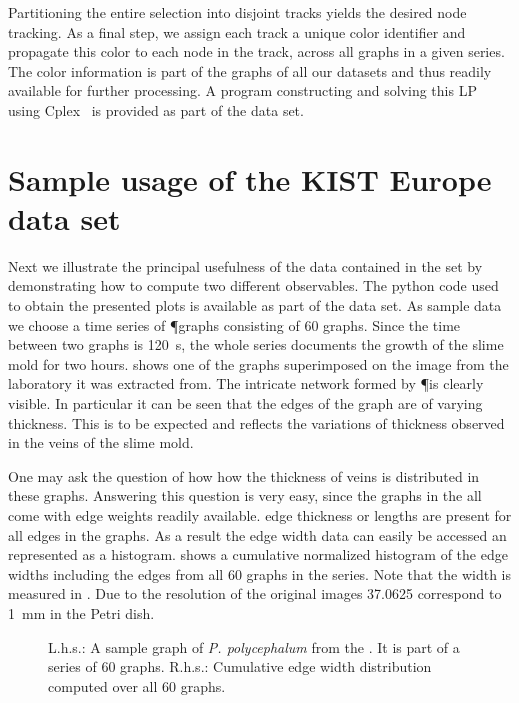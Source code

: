 		Partitioning the entire selection into disjoint tracks yields the desired node tracking. As a final step, we assign each track a unique color identifier and propagate this color to each node in the track, \ie across all graphs in a given series. The color information is part of the graphs of all our datasets and thus readily available for further processing. A program constructing and solving this LP using Cplex~\cite{cplex2005high} is provided as part of the data set.

\section{Sample usage of the KIST Europe data set}

	Next we illustrate the principal usefulness of the data contained in the \data set by demonstrating how to compute two different observables. The python code used to obtain the presented plots is available as part of the data set. As sample data we choose a time series of \P graphs consisting of $60$ graphs. Since the time between two graphs is \SI{120}{\second}, the whole series documents the growth of the slime mold for two hours.  shows one of the graphs superimposed on the image from the laboratory it was extracted from. The intricate network formed by \P is clearly visible. In particular it can be seen that the edges of the graph are of varying thickness. This is to be expected and reflects the variations of thickness observed in the veins of the slime mold. 

	One may ask the question of how how the thickness of veins is distributed in these graphs. Answering this question is very easy, since the graphs in the \data all come with edge weights readily available. \ie edge thickness or lengths are present for all edges in the graphs. As a result the edge width data can easily be accessed an represented as a histogram.  shows a cumulative normalized histogram of the edge widths including the edges from all $60$ graphs in the series. Note that the width is measured in \si{\pixel}. Due to the resolution of the original images \SI{37.0625}{\pixel} correspond to \SI{1}{\milli\metre} in the Petri dish.

	\begin{figure}[!htp]
		\centering
		\qquad
		\caption[Demo: How to compute an observable across an entire series of graphs.]{L.h.s.: A sample graph of \emph{P. polycephalum} from the \data. It is part of a series of $60$ graphs. R.h.s.: Cumulative edge width distribution computed over all $60$ graphs.}
    \end{figure}


